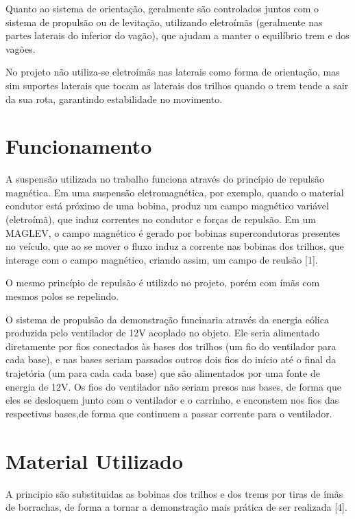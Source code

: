 \documentclass[
	12pt,				%
	openany,			%
	a4paper,			%
	english,			%
	spanish,			%
	brazil,				%
	]{abntex2}
\begin{document}
Quanto ao sistema de orientação, geralmente são controlados juntos com o sistema de propulsão ou de levitação, utilizando eletroímãs (geralmente nas partes laterais do inferior do vagão), que ajudam a manter o equilíbrio trem e dos vagões.

No projeto não utiliza-se eletroímãs nas laterais como forma de orientação, mas sim suportes laterais que tocam as laterais dos trilhos quando o trem tende a sair da sua rota, garantindo estabilidade no movimento.
\chapter{Funcionamento}
A suspensão utilizada no trabalho funciona através do princípio de repulsão magnética. Em uma suspensão eletromagnética, por exemplo, quando o material condutor está próximo de uma bobina, produz um campo magnético variável (eletroímã), que induz correntes no condutor e forças de repulsão. Em um MAGLEV, o campo magnético é gerado por bobinas supercondutoras presentes no veículo, que ao se mover o fluxo induz a corrente nas bobinas dos trilhos, que interage com o campo magnético, criando assim, um campo de reulsão [1].

O mesmo princípio de repulsão é utilizdo no projeto, porém com ímãs com mesmos polos se repelindo.

O sistema de propulsão da demonstração funcinaria através da energia eólica produzida pelo ventilador de 12V acoplado no objeto. Ele seria alimentado diretamente por fios conectados às bases dos trilhos (um fio do ventilador para cada base), e nas bases seriam passados outros dois fios do início até o final da trajetória (um para cada cada base) que são alimentados por uma fonte de energia de 12V. Os fios do ventilador não seriam presos nas bases, de forma que eles se desloquem junto com o ventilador e o carrinho, e enconstem nos fios das respectivas bases,de forma que continuem a passar corrente para o ventilador. 



\chapter{Material Utilizado}
A principio são substituidas as bobinas dos trilhos e dos trems por tiras de ímãs de borrachas, de forma a tornar a demonstração mais prática de ser realizada [4].
\end{document}
